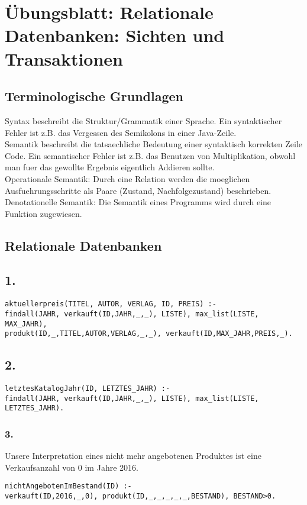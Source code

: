 \documentclass[a4paper, 11pt]{article}
\begin{document}
\setcounter{section}{2}
\section{\"Ubungsblatt: Relationale Datenbanken: Sichten und Transaktionen}
\subsection{Terminologische Grundlagen}
Syntax beschreibt die Struktur/Grammatik einer Sprache. Ein syntaktischer Fehler ist z.B. das Vergessen des Semikolons in einer Java-Zeile. \\
Semantik beschreibt die tatsaechliche Bedeutung einer syntaktisch korrekten Zeile Code. Ein semantischer Fehler ist z.B. das Benutzen von Multiplikation, obwohl man fuer das gewollte Ergebnis eigentlich Addieren sollte. \\
Operationale Semantik: Durch eine Relation werden die moeglichen Ausfuehrungsschritte als Paare (Zustand, Nachfolgezustand) beschrieben.\\
Denotationelle Semantik: Die Semantik eines Programms wird durch eine Funktion zugewiesen.
\subsection{Relationale Datenbanken}
\subsection*{1.}
\begin{verbatim}
aktuellerpreis(TITEL, AUTOR, VERLAG, ID, PREIS) :- 
findall(JAHR, verkauft(ID,JAHR,_,_), LISTE), max_list(LISTE, MAX_JAHR), 
produkt(ID,_,TITEL,AUTOR,VERLAG,_,_), verkauft(ID,MAX_JAHR,PREIS,_).
\end{verbatim}
\subsection*{2.}
\begin{verbatim}
letztesKatalogJahr(ID, LETZTES_JAHR) :-
findall(JAHR, verkauft(ID,JAHR,_,_), LISTE), max_list(LISTE, LETZTES_JAHR).
\end{verbatim}
\subsubsection*{3.}
Unsere Interpretation eines nicht mehr angebotenen Produktes ist eine Verkaufsanzahl von 0 im Jahre 2016.
\begin{verbatim}
nichtAngebotenImBestand(ID) :- 
verkauft(ID,2016,_,0), produkt(ID,_,_,_,_,_,BESTAND), BESTAND>0.
\end{verbatim}
\end{document}
